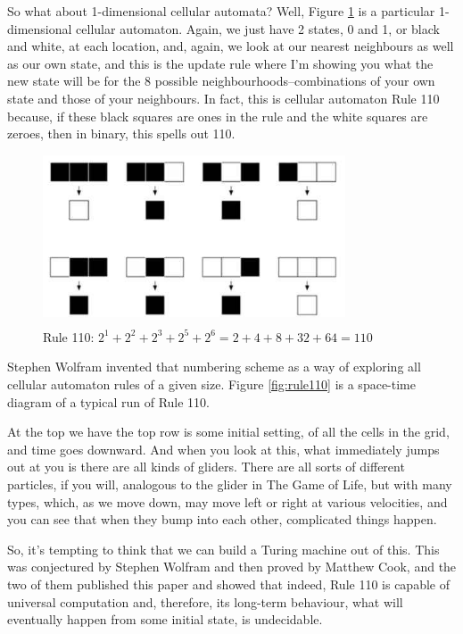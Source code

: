 \documentclass[]{article}
\begin{document}
So what about 1-dimensional cellular automata? Well, Figure \ref{fig:rule110rule} is a particular 1-dimensional cellular automaton. Again, we just have 2 states, 0 and 1, or black and white, at each location, and, again, we look at our nearest neighbours as well as our own state, and this is the update rule where I'm showing you what the new state will be for the 8 possible neighbourhoods--combinations of your own state and those of your neighbours. In fact, this is cellular automaton Rule 110 because, if these black squares are ones in the rule and the white squares are zeroes, then in binary, this spells out 110.
\begin{figure}[H]
	\begin{center}
		\caption[Rule 110]{Rule 110: $2^1 + 2^2+2^3+2^5+2^6=2+4+8+32+64=110$}\label{fig:rule110rule}
		\includegraphics[width=0.8\textwidth]{rule110rule}
	\end{center}
\end{figure}

Stephen Wolfram invented that numbering scheme as a way of exploring all cellular automaton rules of a given size. Figure \ref{fig:rule110} is a space-time diagram of a typical run of Rule 110.

At the top we have the top row is some initial setting, of all the cells in the grid, and time goes downward. And when you look at this, what immediately jumps out at you
is there are all kinds of gliders. There are all sorts of different particles, if you will, analogous to the glider in The Game of Life, but with many types, which, as we move down, may move left or right at various velocities, and you can see that when they bump into each other, complicated things happen.

So, it's tempting to think that we can build a Turing machine out of this.
This was conjectured by Stephen Wolfram and then proved by Matthew Cook\cite{cook2004universality}, and the two of them published this paper and showed that indeed, Rule 110 is capable of universal computation and, therefore, its long-term behaviour, what will eventually happen from some initial state, is undecidable.
\end{document}
